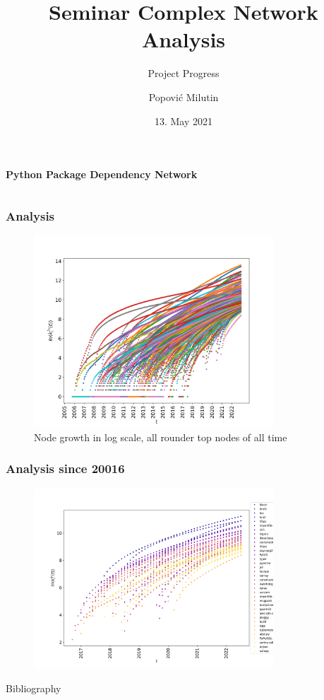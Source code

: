 \documentclass[fleqn]{beamer}
\title
{Seminar Complex Network Analysis}
\subtitle{Project Progress}
\author[Popović Milutin]
{Popović Milutin}
\date{13. May 2021}
\begin{document}
    \begin{frame}
        \titlepage
    \end{frame}

    \begin{frame}
        \centering
        \textbf{Python Package Dependency Network}
        \vspace{1cm}
        \begin{columns}[T]
        \end{columns}
    \end{frame}

    \begin{frame}
        \frametitle{Analysis}
        \begin{figure}[htpb]
            \centering
            \includegraphics[width=0.8\textwidth]{./pics/top_all_edge_growth.png}
            \caption{Node growth in log scale, all rounder top nodes of all
            time}
        \end{figure}
    \end{frame}

    \begin{frame}
        \frametitle{Analysis since 20016}
        \begin{figure}[htpb]
            \centering
            \includegraphics[width=0.8\textwidth]{./pics/deg_2016_growth.png}
        \end{figure}
    \end{frame}


    \begin{frame}{Bibliography}
        \nocite{barabasi}
        \nocite{pypi}
        \printbibliography
    \end{frame}
\end{document}
